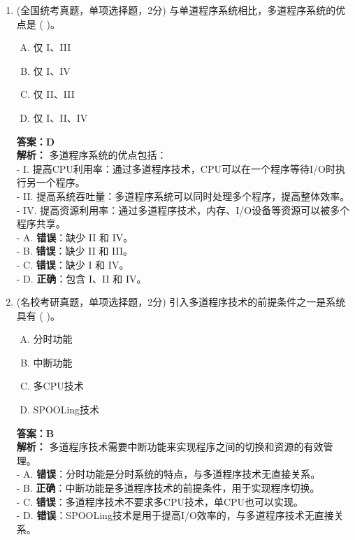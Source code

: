 \documentclass[lang=cn,newtx,10pt,scheme=chinese]{../../elegantbook}
\begin{document}
\begin{enumerate}
\item (全国统考真题，单项选择题，2分) 与单道程序系统相比，多道程序系统的优点是 (    )。
    \begin{enumerate}[A.]
        \item 仅 I、III
        \item 仅 I、IV
        \item 仅 II、III
        \item 仅 I、II、IV
    \end{enumerate}
    \textbf{答案：D}\\
    \textbf{解析：} 多道程序系统的优点包括：\\
    - I. 提高CPU利用率：通过多道程序技术，CPU可以在一个程序等待I/O时执行另一个程序。\\
    - II. 提高系统吞吐量：多道程序系统可以同时处理多个程序，提高整体效率。\\
    - IV. 提高资源利用率：通过多道程序技术，内存、I/O设备等资源可以被多个程序共享。\\
    - A. \textbf{错误}：缺少 II 和 IV。\\
    - B. \textbf{错误}：缺少 II 和 III。\\
    - C. \textbf{错误}：缺少 I 和 IV。\\
    - D. \textbf{正确}：包含 I、II 和 IV。\\

\item (名校考研真题，单项选择题，2分) 引入多道程序技术的前提条件之一是系统具有 (    )。
    \begin{enumerate}[A.]
        \item 分时功能
        \item 中断功能
        \item 多CPU技术
        \item SPOOLing技术
    \end{enumerate}
    \textbf{答案：B}\\
    \textbf{解析：} 多道程序技术需要中断功能来实现程序之间的切换和资源的有效管理。\\
    - A. \textbf{错误}：分时功能是分时系统的特点，与多道程序技术无直接关系。\\
    - B. \textbf{正确}：中断功能是多道程序技术的前提条件，用于实现程序切换。\\
    - C. \textbf{错误}：多道程序技术不要求多CPU技术，单CPU也可以实现。\\
    - D. \textbf{错误}：SPOOLing技术是用于提高I/O效率的，与多道程序技术无直接关系。\\


\end{enumerate}
\end{document}
